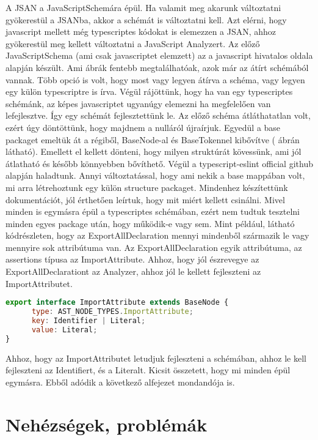 A JSAN a JavaScriptSchemára épül. Ha valamit meg akarunk változtatni gyökerestül a JSANba, akkor a schémát is változtatni kell.
Azt elérni, hogy javascript mellett még typescriptes kódokat is elemezzen a JSAN, ahhoz gyökerestül meg kellett változtatni a JavaScript Analyzert.
Az előző JavaScriptSchema (ami csak javascriptet elemzett) az a javascript hivatalos oldala alapján készült. Ami ábrák fentebb megtalálhatóak, azok már az átírt schémából vannak.
Több opció is volt, hogy most vagy legyen átírva a schéma, vagy legyen egy külön typescriptre is írva.
Végül rájöttünk, hogy ha van egy typescriptes schémánk, az képes javascriptet ugyanúgy elemezni ha megfelelően van lefejlesztve.
Így egy schémát fejlesztettünk le. Az előző schéma átláthatatlan volt, ezért úgy döntöttünk, hogy majdnem a nulláról újraírjuk.
Egyedül a base packaget emeltük át a régiből, BaseNode-al és BaseTokennel kibővítve ( ábrán látható).
Emellett el kellett dönteni, hogy milyen struktúrát kövessünk, ami jól átlatható és később könnyebben bővíthető.
Végül a typescript-eslint official github alapján haladtunk. Annyi változtatással, hogy ami nekik a base mappában volt, mi arra létrehoztunk egy külön structure packaget.
Mindenhez készítettünk dokumentációt, jól érthetően leírtuk, hogy mit miért kellett csinálni.
Mivel minden is egymásra épül a typescriptes schémában, ezért nem tudtuk tesztelni minden egyes package után, hogy működik-e vagy sem.
Mint például, látható  kódrészleten, hogy az ExportAllDeclaration mennyi mindenből származik le vagy mennyire sok attribútuma van.
Az ExportAllDeclaration egyik attribútuma, az assertions típusa az ImportAttribute. Ahhoz, hogy jól észrevegye az ExportAllDeclarationt az Analyzer, ahhoz jól le kellett fejleszteni az ImportAttributet.

\begin{lstlisting}[caption={ImportAttribute},label={lst:asg_file_import_attribute}, language={JavaScript}]
export interface ImportAttribute extends BaseNode {
      type: AST_NODE_TYPES.ImportAttribute;
      key: Identifier | Literal;
      value: Literal;
}
\end{lstlisting}
Ahhoz, hogy az ImportAttributet letudjuk fejleszteni a schémában, ahhoz le kell fejleszteni az Identifiert, és a Literalt.
Kicsit összetett, hogy mi minden épül egymásra. Ebből adódik a következő alfejezet mondandója is.

\section{Nehézségek, problémák}


